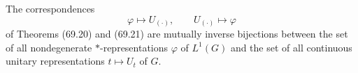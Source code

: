 \begin{theorem}
The correspondences
$$\varphi \mapsto U_{(\cdot)}, \qquad U_{(\cdot)} \mapsto \varphi$$
of Theorems (69.20) and (69.21) are mutually inverse bijections between the set of all nondegenerate $*$-representations $\varphi$ of $L^1(G)$ and the set of all continuous unitary representations $t \mapsto U_t$ of $G$.
\end{theorem}
